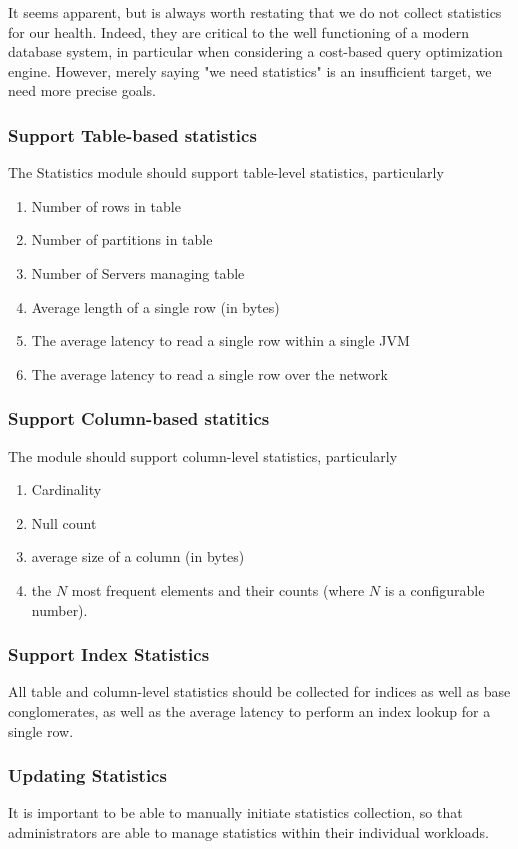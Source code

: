 It seems apparent, but is always worth restating that we do not collect statistics for our health. Indeed, they are critical to the well functioning of a modern database system, in particular when considering a cost-based query optimization engine. However, merely saying "we need statistics" is an insufficient target, we need more precise goals. 

\subsubsection{Support Table-based statistics}
The Statistics module should support table-level statistics, particularly
\begin{enumerate}
\item Number of rows in table
\item Number of partitions in table 
\item Number of Servers managing table
\item Average length of a single row (in bytes)
\item The average latency to read a single row within a single JVM
\item The average latency to read a single row over the network
\end{enumerate}

\subsubsection{Support Column-based statitics}
The module should support column-level statistics, particularly
\begin{enumerate}
\item Cardinality
\item Null count
\item average size of a column (in bytes)
\item the $N$ most frequent elements and their counts (where $N$ is a configurable number).
\end{enumerate}

\subsubsection{Support Index Statistics}
All table and column-level statistics should be collected for indices as well as base conglomerates, as well as the average latency to perform an index lookup for a single row.

\subsubsection{Updating Statistics}
It is important to be able to manually initiate statistics collection, so that administrators are able to manage statistics within their individual workloads. 

